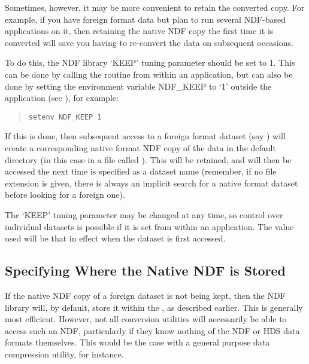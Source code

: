Sometimes, however, it may be more convenient to retain the converted
copy. For example, if you have foreign format data but plan to run
several NDF-based applications on it, then retaining the native NDF
copy the first time it is converted will save you having to re-convert
the data on subsequent occasions.

To do this, the NDF library `KEEP' tuning parameter should be set to
1. This can be done by calling the 
routine from within an application, but can also be done by setting
the environment variable NDF\_KEEP to `1' outside the application (see
), for example:

\begin{quote}
\begin{small}
\begin{verbatim}
setenv NDF_KEEP 1
\end{verbatim}
\end{small}
\end{quote}

If this is done, then subsequent access to a foreign format dataset
(say ) will create a corresponding native format NDF
copy of the data in the default directory (in this case in a file
called ). This will be retained, and will then be
accessed the next time  is specified as a dataset name
(remember, if no file extension is given, there is always an implicit
search for a native format dataset before looking for a foreign one).

The `KEEP' tuning parameter may be changed at any time, so control
over individual datasets is possible if it is set from within an
application. The value used will be that in effect when the dataset is
first accessed.

\subsection{\label{sect:whichndf}Specifying Where the Native NDF is Stored}

If the native NDF copy of a foreign dataset is not being kept, then
the NDF library will, by default, store it within the
 , as
described earlier. This is generally most efficient. However, not all
conversion utilities will necessarily be able to access such an NDF,
particularly if they know nothing of the NDF or HDS data formats
themselves. This would be the case with a general purpose data
compression utility, for instance.

